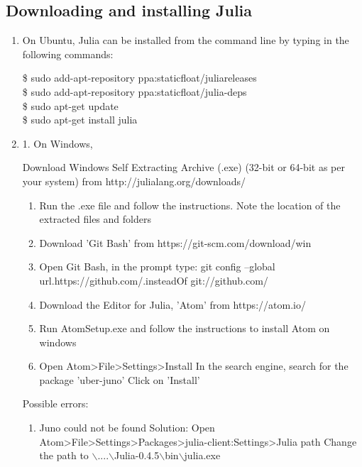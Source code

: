 \subsection{Downloading and installing Julia}\label{julia-installation}
\begin{enumerate}
\item On Ubuntu, Julia can be installed from the command line by typing in the 
following commands:

\$ sudo add-apt-repository ppa:staticfloat/juliareleases \\
\$ sudo add-apt-repository ppa:staticfloat/julia-deps \\
\$ sudo apt-get update \\
\$ sudo apt-get install julia \\
\item 1. On Windows,


Download Windows Self Extracting Archive (.exe)  (32-bit or 64-bit as per your system) from http://julialang.org/downloads/

\begin{enumerate}
      \item Run the .exe file and follow the instructions. Note the location of the extracted files and folders
      \item Download 'Git Bash' from https://git-scm.com/download/win
      \item Open Git Bash, in the prompt type:
            git config --global url.https://github.com/.insteadOf git://github.com/
            
      \item Download the Editor for Julia, 'Atom' from https://atom.io/
      \item Run AtomSetup.exe and follow the instructions to install Atom on windows
      \item Open Atom>File>Settings>Install
            In the search engine, search for the package 'uber-juno'
            Click on 'Install'
\end{enumerate}

Possible errors:

\begin{enumerate}

      \item Juno could not be found
            Solution: Open Atom>File>Settings>Packages>julia-client:Settings>Julia path
            Change the path to $\backslash$....$\backslash$Julia-0.4.5$\backslash$bin$\backslash$julia.exe
            

\end{enumerate}
\end{enumerate}
